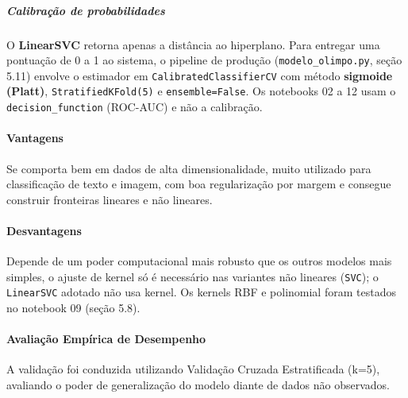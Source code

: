\documentclass[
  brazilian,
  11pt,
]{article}
\begin{document}
\subparagraph{Calibração de probabilidades}\label{calibrauxe7uxe3o-de-probabilidades}

O \textbf{LinearSVC} retorna apenas a distância ao hiperplano. Para entregar uma pontuação de 0 a 1 ao sistema, o pipeline de produção (\texttt{modelo\_olimpo.py}, seção 5.11) envolve o estimador em \texttt{CalibratedClassifierCV} com método \textbf{sigmoide (Platt)}, \texttt{StratifiedKFold(5)} e \texttt{ensemble=False}. Os notebooks 02 a 12 usam o \texttt{decision\_function} (ROC-AUC) e não a calibração.

\paragraph{Vantagens}\label{vantagens}

Se comporta bem em dados de alta dimensionalidade, muito utilizado para classificação de texto e imagem, com boa regularização por margem e consegue construir fronteiras lineares e não lineares.

\paragraph{Desvantagens}\label{desvantagens}

Depende de um poder computacional mais robusto que os outros modelos mais simples, o ajuste de kernel só é necessário nas variantes não lineares (\texttt{SVC}); o \texttt{LinearSVC} adotado não usa kernel. Os kernels RBF e polinomial foram testados no notebook 09 (seção 5.8).

\paragraph{Avaliação Empírica de Desempenho}\label{avaliauxe7uxe3o-empuxedrica-de-desempenho}

A validação foi conduzida utilizando Validação Cruzada Estratificada (k=5), avaliando o poder de generalização do modelo diante de dados não observados.
\end{document}
